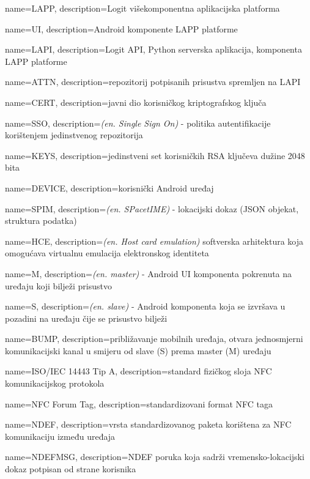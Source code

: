 {name={LAPP}, description={Logit višekomponentna aplikacijska platforma}}

{name={UI}, description={Android komponente LAPP platforme}}

{name={LAPI}, description={Logit API, Python serverska aplikacija, komponenta LAPP platforme}}

{name={ATTN}, description={repozitorij potpisanih prisustva spremljen na LAPI}}

{name={CERT}, description={javni dio korisničkog kriptografskog ključa}}

{name={SSO}, description={\textit{(en. Single Sign On)} - politika autentifikacije korištenjem jedinstvenog repozitorija}}

{name={KEYS}, description={jedinstveni set korisničkih RSA ključeva dužine 2048 bita}}

{name={DEVICE}, description={korisnički Android uređaj}}

{name={SPIM}, description={\textit{(en. SPacetIME)} - lokacijski dokaz (JSON objekat, struktura podatka)}}

{name={HCE}, description={\textit{(en. Host card emulation)} softverska arhitektura koja omogućava virtualnu emulacija elektronskog identiteta}}

{name={M}, description={\textit{(en. master)} - Android UI komponenta pokrenuta na uređaju koji bilježi prisustvo}}

{name={S}, description={\textit{(en. slave)} - Android komponenta koja se izvršava u pozadini na uređaju čije se prisustvo bilježi}}

{name={BUMP}, description={približavanje mobilnih uređaja, otvara jednosmjerni komunikacijski kanal u smijeru od slave (S) prema master (M) uređaju}}

{name={ISO/IEC 14443 Tip A}, description={standard fizičkog sloja NFC komunikacijskog protokola}}

{name={NFC Forum Tag}, description={standardizovani format NFC taga}}

{name={NDEF}, description={vrsta standardizovanog paketa korištena za NFC komunikaciju između uređaja}}

{name={NDEFMSG}, description={NDEF poruka koja sadrži vremensko-lokacijski dokaz potpisan od strane korisnika}}